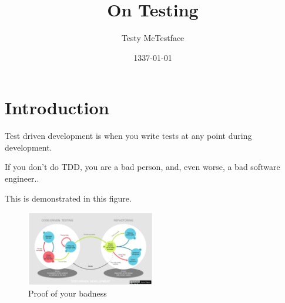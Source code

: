 \documentclass{article}
\title{On Testing}
\author{Testy McTestface}
\date{1337-01-01}
\begin{document}
\section{Introduction}

Test driven development is when you write tests at any point during development\parencite{Fucci_2017}.

If you don't do TDD, you are a bad person, and, even worse, a bad software engineer.\parencite{Pan_ur_2011}.

This is demonstrated in this figure.
\begin{figure}[h]
  \centering
  \includegraphics[width=0.5\textwidth]{image1.png}
  \caption{Proof of your badness}
  \label{fig:test}
\end{figure}


\printbibliography
\end{document}
